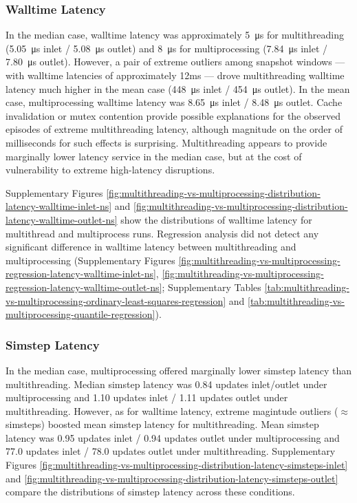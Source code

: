 \subsubsection{Walltime Latency}

In the median case, walltime latency was approximately \SI{5}{\micro\second} for multithreading (\SI{5.05}{\micro\second} inlet / \SI{5.08}{\micro\second} outlet) and \SI{8}{\micro\second} for multiprocessing (\SI{7.84}{\micro\second} inlet / \SI{7.80}{\micro\second} outlet).
However, a pair of extreme outliers among snapshot windows --- with walltime latencies of approximately 12ms --- drove multithreading walltime latency much higher in the mean case (\SI{448}{\micro\second} inlet / \SI{454}{\micro\second} outlet).
In the mean case, multiprocessing walltime latency was \SI{8.65}{\micro\second} inlet / \SI{8.48}{\micro\second} outlet.
Cache invalidation or mutex contention provide possible explanations for the observed episodes of extreme multithreading latency, although magnitude on the order of milliseconds for such effects is surprising.
Multithreading appears to provide marginally lower latency service in the median case, but at the cost of vulnerability to extreme high-latency disruptions.

Supplementary Figures \ref{fig:multithreading-vs-multiprocessing-distribution-latency-walltime-inlet-ns} and \ref{fig:multithreading-vs-multiprocessing-distribution-latency-walltime-outlet-ns} show the distributions of walltime latency for multithread and multiprocess runs.
Regression analysis did not detect any significant difference in walltime latency between multithreading and multiprocessing (Supplementary Figures \ref{fig:multithreading-vs-multiprocessing-regression-latency-walltime-inlet-ns}, \ref{fig:multithreading-vs-multiprocessing-regression-latency-walltime-outlet-ns}; Supplementary Tables \ref{tab:multithreading-vs-multiprocessing-ordinary-least-squares-regression} and \ref{tab:multithreading-vs-multiprocessing-quantile-regression}).

\subsubsection{Simstep Latency}

In the median case, multiprocessing offered marginally lower simstep latency than multithreading.
Median simstep latency was 0.84 updates inlet/outlet under multiprocessing and 1.10 updates inlet / 1.11 updates outlet under multithreading.
However, as for walltime latency, extreme magintude outliers ($\approx$  simsteps) boosted mean simstep latency for multithreading.
Mean simstep latency was 0.95 updates inlet / 0.94 updates outlet under multiprocessing and 77.0 updates inlet / 78.0 updates outlet under multithreading.
Supplementary Figures \ref{fig:multithreading-vs-multiprocessing-distribution-latency-simsteps-inlet} and \ref{fig:multithreading-vs-multiprocessing-distribution-latency-simsteps-outlet} compare the distributions of simstep latency across these conditions.

